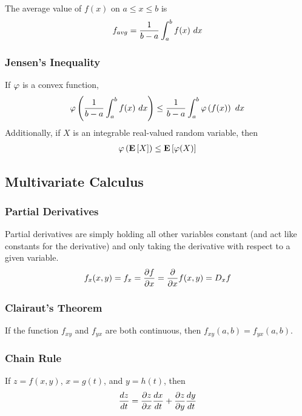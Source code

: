 The average value of $f(x)$ on $a\leq x\leq b$ is
\begin{align*}
	f_{avg}=\frac{1}{b-a}\int_a^b f(x)\ dx
\end{align*}

\subsubsection*{Jensen's Inequality}

If $\varphi$ is a convex function,
\begin{align*}
	\varphi\left(\frac{1}{b-a}\int_a^b f(x)\ dx\right)\leq\frac{1}{b-a}\int_a^b\varphi\left(f(x)\right)\ dx
\end{align*}
Additionally, if $X$ is an integrable real-valued random variable, then
\begin{align*}
	\varphi\left(\mathbf{E}\left[X\right]\right)\leq\mathbf{E}\left[\varphi(X)\right]
\end{align*}

\subsection{Multivariate Calculus}

\subsubsection*{Partial Derivatives}

Partial derivatives are simply holding all other variables constant (and act like constants for the derivative) and only taking the derivative with respect to a given variable.
\begin{align*}
	f_x(x,y)=f_x=\frac{\partial f}{\partial x}=\frac{\partial}{\partial x}f(x,y)=D_x f
\end{align*}

\subsubsection*{Clairaut's Theorem}

If the function $f_{xy}$ and $f_{yx}$ are both continuous, then $f_{xy}(a,b)=f_{yx}(a,b)$.

\subsubsection*{Chain Rule}

If $z=f(x,y)$, $x=g(t)$, and $y=h(t)$, then
\begin{align*}
	\frac{dz}{dt}=\frac{\partial z}{\partial x}\frac{dx}{dt}+\frac{\partial z}{\partial y}\frac{dy}{dt}
\end{align*}

